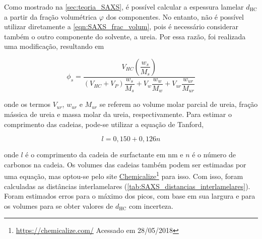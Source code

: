 	Como mostrado na \autoref{sec:teoria_SAXS}, é possível calcular a espessura lamelar \(d_\mathrm{HC}\) a partir da fração volumétrica \(\varphi\) dos componentes. No entanto, não é possível utilizar diretamente a \autoref{eqn:SAXS_frac_volum}, pois é necessário considerar também o outro componente do solvente, a ureia. Por essa razão, foi realizada uma modificação, resultando em
	
	\begin{equation}
		\phi_s = \dfrac{V_{\textit{HC}}\left( \dfrac{w_{s}}{M_{s}} \right)}{\left( V_{\textit{HC}} + V_{P} \right)\dfrac{w_{s}}{M_{s}} + V_{w}\dfrac{w_{w}}{M_{w}} + V_{\textit{ur}}\dfrac{w_{\textit{ur}}}{M_{\textit{ur}}}}
		\label{eqn:SAXS_frac_volum_com_ureia}
	\end{equation} 

	\noindent onde os termos \(V_{\textit{ur}}\), \(w_{\textit{ur}}\) e \(M_{\textit{ur}}\)	se referem ao volume molar parcial de ureia, fração mássica de ureia e massa molar da ureia, respectivamente. Para estimar o comprimento das cadeias, pode-se utilizar a equação de Tanford,\cite{Israelachvili2011}
	
	\begin{equation}
		l = 0{,}150 + 0{,}126n
		\label{eqn:tanford}
	\end{equation}
	
	\noindent onde \(l\) é o comprimento da cadeia de surfactante em nm e \(n\) é o número de carbonos na cadeia. Os volumes das cadeias também podem ser estimadas por uma equação, mas optou-se pelo site \href{www.chemicalize.com}{Chemicalize}\footnote{\url{https://chemicalize.com/} Acessado em 28/05/2018} para isso. Com isso, foram calculadas as distâncias interlamelares (\autoref{tab:SAXS_distancias_interlamelares}). Foram estimados erros para o máximo dos picos, com base em sua largura e para os volumes para se obter valores de \(d_\mathrm{HC}\) com incerteza.  
	
